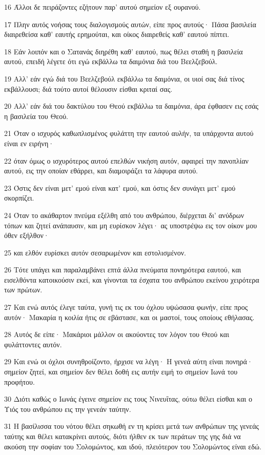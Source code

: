 \par 16 Άλλοι δε πειράζοντες εζήτουν παρ' αυτού σημείον εξ ουρανού.
\par 17 Πλην αυτός νοήσας τους διαλογισμούς αυτών, είπε προς αυτούς· Πάσα βασιλεία διαιρεθείσα καθ' εαυτής ερημούται, και οίκος διαιρεθείς καθ' εαυτού πίπτει.
\par 18 Εάν λοιπόν και ο Σατανάς διηρέθη καθ' εαυτού, πως θέλει σταθή η βασιλεία αυτού, επειδή λέγετε ότι εγώ εκβάλλω τα δαιμόνια διά του Βεελζεβούλ.
\par 19 Αλλ' εάν εγώ διά του Βεελζεβούλ εκβάλλω τα δαιμόνια, οι υιοί σας διά τίνος εκβάλλουσι; διά τούτο αυτοί θέλουσιν είσθαι κριταί σας.
\par 20 Αλλ' εάν διά του δακτύλου του Θεού εκβάλλω τα δαιμόνια, άρα έφθασεν εις εσάς η βασιλεία του Θεού.
\par 21 Όταν ο ισχυρός καθωπλισμένος φυλάττη την εαυτού αυλήν, τα υπάρχοντα αυτού είναι εν ειρήνη·
\par 22 όταν όμως ο ισχυρότερος αυτού επελθών νικήση αυτόν, αφαιρεί την πανοπλίαν αυτού, εις την οποίαν εθάρρει, και διαμοιράζει τα λάφυρα αυτού.
\par 23 Όστις δεν είναι μετ' εμού είναι κατ' εμού, και όστις δεν συνάγει μετ' εμού σκορπίζει.
\par 24 Όταν το ακάθαρτον πνεύμα εξέλθη από του ανθρώπου, διέρχεται δι' ανύδρων τόπων και ζητεί ανάπαυσιν, και μη ευρίσκον λέγει· ας υποστρέψω εις τον οίκον μου όθεν εξήλθον·
\par 25 και ελθόν ευρίσκει αυτόν σεσαρωμένον και εστολισμένον.
\par 26 Τότε υπάγει και παραλαμβάνει επτά άλλα πνεύματα πονηρότερα εαυτού, και εισελθόντα κατοικούσιν εκεί, και γίνονται τα έσχατα του ανθρώπου εκείνου χειρότερα των πρώτων.
\par 27 Και ενώ αυτός έλεγε ταύτα, γυνή τις εκ του όχλου υψώσασα φωνήν, είπε προς αυτόν· Μακαρία η κοιλία ήτις σε εβάστασε, και οι μαστοί, τους οποίους εθήλασας.
\par 28 Αυτός δε είπε· Μακάριοι μάλλον οι ακούοντες τον λόγον του Θεού και φυλάττοντες αυτόν.
\par 29 Και ενώ οι όχλοι συνηθροίζοντο, ήρχισε να λέγη· Η γενεά αύτη είναι πονηρά· σημείον ζητεί, και σημείον δεν θέλει δοθή εις αυτήν ειμή το σημείον Ιωνά του προφήτου.
\par 30 Διότι καθώς ο Ιωνάς έγεινε σημείον εις τους Νινευΐτας, ούτω θέλει είσθαι και ο Υιός του ανθρώπου εις την γενεάν ταύτην.
\par 31 Η βασίλισσα του νότου θέλει σηκωθή εν τη κρίσει μετά των ανθρώπων της γενεάς ταύτης και θέλει κατακρίνει αυτούς, διότι ήλθεν εκ των περάτων της γης διά να ακούση την σοφίαν του Σολομώντος, και ιδού, πλειότερον του Σολομώντος είναι εδώ.
